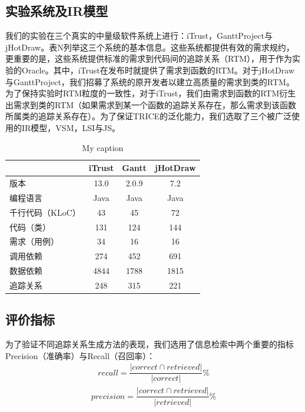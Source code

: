 \subsection{实验系统及IR模型}
我们的实验在三个真实的中量级软件系统上进行：iTrust，GanttProject与jHotDraw。表N列举这三个系统的基本信息。这些系统都提供有效的需求规约，更重要的是，这些系统提供标准的需求到代码间的追踪关系（RTM），用于作为实验的Oracle。其中，iTrust在发布时就提供了需求到函数的RTM。对于jHotDraw与GanttProject，我们招募了系统的原开发者以建立高质量的需求到类的RTM。为了保持实验时RTM粒度的一致性，对于iTrust，我们由需求到函数的RTM衍生出需求到类的RTM（如果需求到某一个函数的追踪关系存在，那么需求到该函数所属类的追踪关系存在）。为了保证TRICE的泛化能力，我们选取了三个被广泛使用的IR模型，VSM，LSI与JS。

\begin{table}[]
\centering
\caption{My caption}
\label{my-label}
\begin{tabular}{@{}lccc@{}}
\toprule
           & iTrust & Gantt & jHotDraw \\ \midrule
版本         & 13.0   & 2.0.9 & 7.2      \\
编程语言       & Java   & Java  & Java     \\
千行代码（KLoC） & 43     & 45    & 72       \\
代码（类）      & 131    & 124   & 144      \\
需求（用例）     & 34     & 16    & 16       \\
调用依赖     & 274    & 452   & 691      \\
数据依赖       & 4844   & 1788  & 1815     \\
追踪关系       & 248    & 315   & 221      \\ \bottomrule
\end{tabular}
\end{table}

\subsection{评价指标}
为了验证不同追踪关系生成方法的表现，我们选用了信息检索中两个重要的指标Precision（准确率）与Recall（召回率）：
\begin{align}recall=\dfrac {\left| correct\cap retrieved\right| } {\left| correct\right| }\% \end{align}
\begin{align}precision=\dfrac {\left| correct\cap retrieved\right| } {\left| retrieved\right| }\% \end{align}

